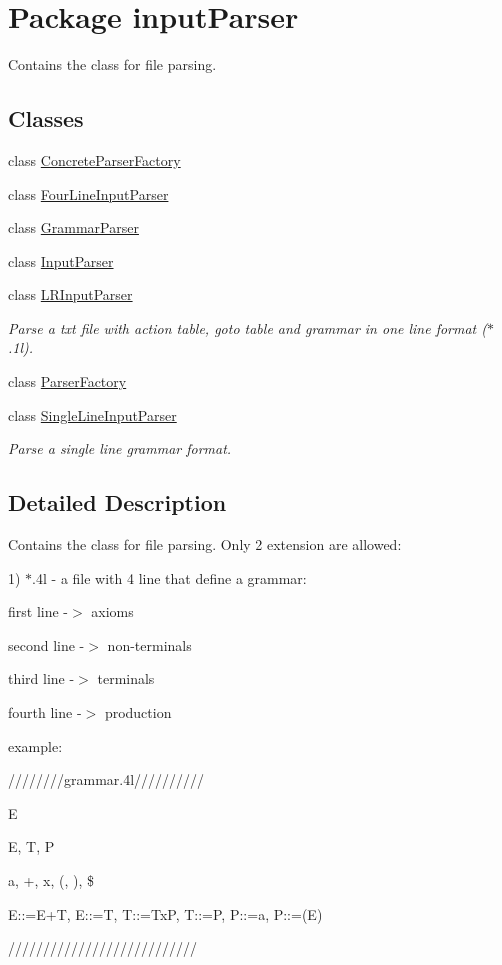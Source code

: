 \hypertarget{namespaceinput_parser}{\section{Package input\-Parser}
\label{namespaceinput_parser}
}


Contains the class for file parsing.  


\subsection*{Classes}
\begin{DoxyCompactItemize}
\item 
class \hyperlink{classinput_parser_1_1_concrete_parser_factory}{Concrete\-Parser\-Factory}
\item 
class \hyperlink{classinput_parser_1_1_four_line_input_parser}{Four\-Line\-Input\-Parser}
\item 
class \hyperlink{classinput_parser_1_1_grammar_parser}{Grammar\-Parser}
\item 
class \hyperlink{classinput_parser_1_1_input_parser}{Input\-Parser}
\item 
class \hyperlink{classinput_parser_1_1_l_r_input_parser}{L\-R\-Input\-Parser}
\begin{DoxyCompactList}\small\item\em Parse a txt file with action table, goto table and grammar in one line format ($\ast$.1l). \end{DoxyCompactList}\item 
class \hyperlink{classinput_parser_1_1_parser_factory}{Parser\-Factory}
\item 
class \hyperlink{classinput_parser_1_1_single_line_input_parser}{Single\-Line\-Input\-Parser}
\begin{DoxyCompactList}\small\item\em Parse a single line grammar format. \end{DoxyCompactList}\end{DoxyCompactItemize}


\subsection{Detailed Description}
Contains the class for file parsing. Only 2 extension are allowed\-:\par
 1) $\ast$.4l -\/ a file with 4 line that define a grammar\-:\par
 first line -\/$>$ axioms\par
 second line -\/$>$ non-\/terminals\par
 third line -\/$>$ terminals\par
 fourth line -\/$>$ production\par
 example\-: \par
 ////////grammar.4l//////////\par
 E\par
 E, T, P\par
 a, +, x, (, ), \$\par
 E\-:\-:=E+\-T, E\-:\-:=T, T\-:\-:=Tx\-P, T\-:\-:=P, P\-:\-:=a, P\-:\-:=(E)\par
 ///////////////////////////\par


